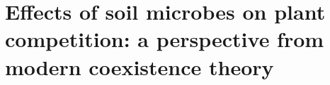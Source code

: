 \chapter{Effects of soil microbes on plant competition: a perspective from modern coexistence theory}
\fancyhead[LE, RO]{\thepage}
\fancyfoot{}
\renewcommand{\headrulewidth}{0pt}
\setlength{\parindent}{1cm}

